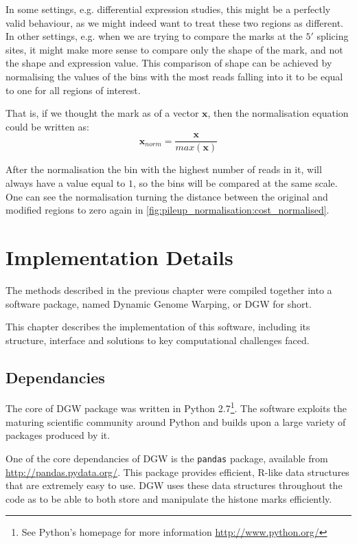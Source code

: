 \documentclass[parskip]{cs4rep}
\begin{document}
In some settings, e.g. differential expression studies, this might be a perfectly valid behaviour, as we might indeed want to treat these two regions as different.
In other settings, e.g. when we are trying to compare the marks at the $5'$ splicing sites, it might make more sense to compare only the shape of the mark, and not the shape and expression value. This comparison of shape can be achieved by normalising the values of the bins with the most reads falling into it to be equal to one for all regions of interest.

That is, if we thought the mark as of a vector $\mathbf{x}$, then the normalisation equation could be written as:
\begin{equation}
   \mathbf{x}_{norm} = \frac{\mathbf{x}}{max (\mathbf{x})}
\end{equation}

After the normalisation the bin with the highest number of reads in it, will always have a value equal to $1$, so the bins will be compared at the same scale. One can see the normalisation turning the distance between the original and modified regions to zero again in \autoref{fig:pileup_normalisation:cost_normalised}.

\chapter{Implementation Details}
The methods described in the previous chapter were compiled together into a software package, named Dynamic Genome Warping, or DGW for short. 

This chapter describes the implementation of this software, including its structure, interface and solutions to key computational challenges faced.

\section{Dependancies}
The core of DGW package was written in Python 2.7\footnote{See Python's homepage for more information \url{http://www.python.org/}}. The software exploits the maturing scientific community around Python and builds upon a large variety of packages produced by it.

One of the core dependancies of DGW is the \verb"pandas" package, available from \url{http://pandas.pydata.org/}. This package provides efficient, R-like data structures that are extremely easy to use. DGW uses these data structures throughout the code as to be able to both store and manipulate the histone marks efficiently. 
\end{document}
